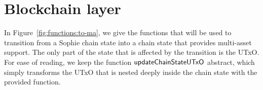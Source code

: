 \section{Blockchain layer}
\label{sec:chain}

\newcommand{\Proof}{\type{Proof}}
\newcommand{\Seedl}{\mathsf{Seed}_\ell}
\newcommand{\Seede}{\mathsf{Seed}_\eta}
\newcommand{\activeSlotCoeff}[1]{\fun{activeSlotCoeff}~ \var{#1}}
\newcommand{\slotToSeed}[1]{\fun{slotToSeed}~ \var{#1}}

\newcommand{\T}{\type{T}}
\newcommand{\vrf}[3]{\fun{vrf}_{#1} ~ #2 ~ #3}
\newcommand{\verifyVrf}[4]{\fun{verifyVrf}_{#1} ~ #2 ~ #3 ~#4}

\newcommand{\HashHeader}{\type{HashHeader}}
\newcommand{\HashBBody}{\type{HashBBody}}
\newcommand{\bhHash}[1]{\fun{bhHash}~ \var{#1}}
\newcommand{\bHeaderSize}[1]{\fun{bHeaderSize}~ \var{#1}}
\newcommand{\bSize}[1]{\fun{bSize}~ \var{#1}}
\newcommand{\bBodySize}[1]{\fun{bBodySize}~ \var{#1}}
\newcommand{\OCert}{\type{OCert}}
\newcommand{\BHeader}{\type{BHeader}}
\newcommand{\BHBody}{\type{BHBody}}

\newcommand{\bheader}[1]{\fun{bheader}~\var{#1}}
\newcommand{\hsig}[1]{\fun{hsig}~\var{#1}}
\newcommand{\bprev}[1]{\fun{bprev}~\var{#1}}
\newcommand{\bhash}[1]{\fun{bhash}~\var{#1}}
\newcommand{\bvkcold}[1]{\fun{bvkcold}~\var{#1}}
\newcommand{\bseedl}[1]{\fun{bseed}_{\ell}~\var{#1}}
\newcommand{\bprfn}[1]{\fun{bprf}_{n}~\var{#1}}
\newcommand{\bseedn}[1]{\fun{bseed}_{n}~\var{#1}}
\newcommand{\bprfl}[1]{\fun{bprf}_{\ell}~\var{#1}}
\newcommand{\bocert}[1]{\fun{bocert}~\var{#1}}
\newcommand{\bnonce}[1]{\fun{bnonce}~\var{#1}}
\newcommand{\bleader}[1]{\fun{bleader}~\var{#1}}
\newcommand{\hBbsize}[1]{\fun{hBbsize}~\var{#1}}
\newcommand{\bbodyhash}[1]{\fun{bbodyhash}~\var{#1}}
\newcommand{\overlaySchedule}[4]{\fun{overlaySchedule}~\var{#1}~\var{#2}~{#3}~\var{#4}}

\newcommand{\PrtclState}{\type{PrtclState}}
\newcommand{\PrtclEnv}{\type{PrtclEnv}}
\newcommand{\OverlayEnv}{\type{OverlayEnv}}
\newcommand{\VRFState}{\type{VRFState}}
\newcommand{\NewEpochEnv}{\type{NewEpochEnv}}
\newcommand{\NewEpochState}{\type{NewEpochState}}
\newcommand{\PoolDistr}{\type{PoolDistr}}
\newcommand{\BBodyEnv}{\type{BBodyEnv}}
\newcommand{\BBodyState}{\type{BBodyState}}
\newcommand{\RUpdEnv}{\type{RUpdEnv}}
\newcommand{\ChainEnv}{\type{ChainEnv}}
\newcommand{\ChainState}{\type{ChainState}}
\newcommand{\ChainSig}{\type{ChainSig}}

In Figure~\ref{fig:functions:to-ma}, we give the functions that will be used
to transition from a Sophie chain state into a chain state that provides multi-asset support.
The only part of the state that is affected by the transition is the UTxO. For ease of
reading, we keep the function $\mathsf{updateChainStateUTxO}$ abstract, which simply transforms the
UTxO that is nested deeply inside the chain state with the provided function.

